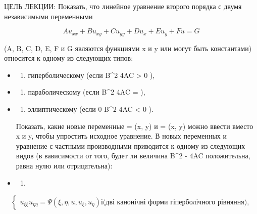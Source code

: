 \documentclass[
  ukrainian,
]{article}
\providecommand{\tightlist}{%
  \setlength{\itemsep}{0pt}\setlength{\parskip}{0pt}}
\begin{document}
ЦЕЛЬ ЛЕКЦИИ: Показать, что линейное уравнение второго порядка с двумя
независимыми переменными

\[
Au_{xx} + Bu_{xy} + Cu_{yy} + Du_x + Eu_y + Fu = G
\]

(A, B, C, D, E, F и G являются функциями x и y или могут быть
константами) относится к одному из следующих типов:

\begin{itemize}
\item
  \begin{enumerate}
  \def\labelenumi{\arabic{enumi})}
  \tightlist
  \item
    гиперболическому (если B\^{}2 4AC \textgreater{} 0 ),
  \end{enumerate}
\item
  \begin{enumerate}
  \def\labelenumi{\arabic{enumi})}
  \setcounter{enumi}{1}
  \tightlist
  \item
    параболическому (если B\^{}2 4AC = ),
  \end{enumerate}
\item
  \begin{enumerate}
  \def\labelenumi{\arabic{enumi})}
  \setcounter{enumi}{2}
  \tightlist
  \item
    эллиптическому (если 0 B\^{}2 4AC \textless{} 0 ).
  \end{enumerate}

  Показать, какие новые переменные \xi = \xi(x, y) и \eta = \eta(x, y)
  можно ввести вместо x и y, чтобы упростить исходное уравнение. В новых
  переменных \xi   и \eta   уравнение с частными производными приводится
  к одному из следующих видов (в вависимости от того, будет ли величина
  B\^{}2 - 4AC положительна, равна нулю или отрицательна):
\item
  \begin{enumerate}
  \def\labelenumi{\arabic{enumi}.}
  \tightlist
  \item
  \end{enumerate}
\end{itemize}

\[
\begin{cases} u_{\xi\xi} u_{\eta\eta} = \Psi(\xi,  \eta, u, u_{\xi}, u_{\eta}) і \text{(дві канонічні форми гіперболічного рівняння),} \end{cases}
\]
\end{document}
